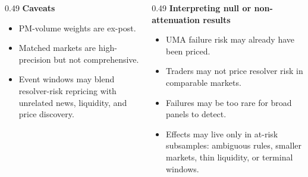 \documentclass[aspectratio=169,10pt]{beamer}
\newcommand{\tightitem}{\setlength\itemsep{0.25em}}
\begin{document}
\begin{frame}
\small
\begin{columns}[T,onlytextwidth]
\begin{column}{0.49\textwidth}
\textbf{Caveats}
\begin{itemize}
\tightitem
\item PM-volume weights are ex-post.
\item Matched markets are high-precision but not comprehensive.
\item Event windows may blend resolver-risk repricing with unrelated news, liquidity, and price discovery.
\end{itemize}
\end{column}
\begin{column}{0.49\textwidth}
\textbf{Interpreting null or non-attenuation results}
\begin{itemize}
\tightitem
\item UMA failure risk may already have been priced.
\item Traders may not price resolver risk in comparable markets.
\item Failures may be too rare for broad panels to detect.
\item Effects may live only in at-risk subsamples: ambiguous rules, smaller markets, thin liquidity, or terminal windows.
\end{itemize}
\end{column}
\end{columns}
\end{frame}
\end{document}
